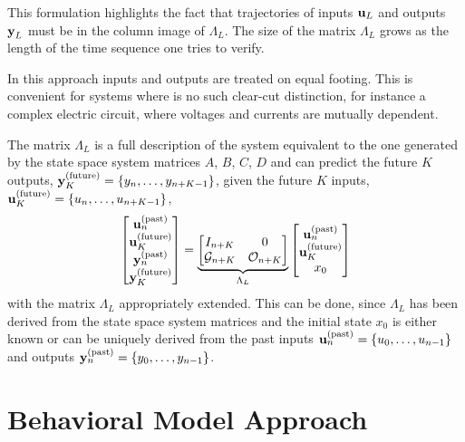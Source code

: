 This formulation highlights the fact that trajectories of inputs $\boldsymbol{\mathrm{u}}_L$ and outputs $\boldsymbol{\mathrm{y}}_L$ must be in the column image of $\Lambda_L$. The size of the matrix $\Lambda_L$ grows as the length of the time sequence one tries to verify.

In this approach inputs and outputs are treated on equal footing. This is convenient for systems where is no such clear-cut distinction, for instance a complex electric circuit, where voltages and currents are mutually dependent.

The matrix $\Lambda_L$ is a full description of the system equivalent to the one generated by the state space system matrices $A$, $B$, $C$, $D$ and can predict the future $K$ outputs, $\boldsymbol{\mathrm{y}}_K^{(\textrm{future})} = \{y_n,\ldots,y_{n+K-1}\}$, given the future $K$ inputs, $\boldsymbol{\mathrm{u}}_K^{(\textrm{future})} = \{u_n,\ldots,u_{n+K-1}\}$,
\begin{equation*}
  \begin{bmatrix}
    \boldsymbol{\mathrm{u}}_n^{(\textrm{past})} \\ \boldsymbol{\mathrm{u}}_K^{(\textrm{future})} \\ \boldsymbol{\mathrm{y}}_n^{(\textrm{past})} \\ \boldsymbol{\mathrm{y}}_K^{(\textrm{future})}
  \end{bmatrix} = \underbrace{
  \begin{bmatrix}
    I_{n+K} & 0 \\ \mathcal{G}_{n+K} & \mathcal{O}_{n+K}
  \end{bmatrix}}_{\Lambda_L}
  \begin{bmatrix}
    \boldsymbol{\mathrm{u}}_n^{(\textrm{past})} \\ \boldsymbol{\mathrm{u}}_K^{(\textrm{future})} \\ x_0
  \end{bmatrix}
\end{equation*}
with the matrix $\Lambda_L$ appropriately extended. This can be done, since $\Lambda_L$ has been derived from the state space system matrices and the initial state $x_0$ is either known or can be uniquely derived from the past inputs $\boldsymbol{\mathrm{u}}_n^{(\textrm{past})} = \{u_0,\ldots,u_{n-1}\}$ and outputs $\boldsymbol{\mathrm{y}}_n^{(\textrm{past})} = \{y_0,\ldots,y_{n-1}\}$.

\section{Behavioral Model Approach}
\label{sec:behavioral-model-approach}

